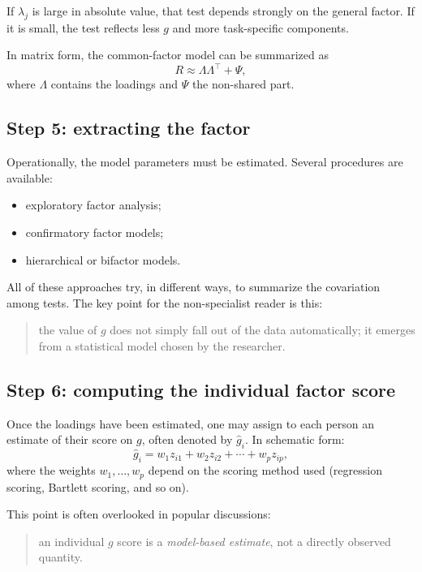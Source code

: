 \documentclass[10pt, a4paper]{article}
\theoremstyle{plain}
\theoremstyle{definition}
\theoremstyle{remark}
\begin{document}
If $\lambda_j$ is large in absolute value, that test depends strongly on the
general factor. If it is small, the test reflects less $g$ and more task-specific
components.

In matrix form, the common-factor model can be summarized as
\begin{equation}
R \approx \Lambda\Lambda^\top + \Psi,
\label{eq:commonfactor}
\end{equation}
where $\Lambda$ contains the loadings and $\Psi$ the non-shared part.

\subsection{Step 5: extracting the factor}

Operationally, the model parameters must be estimated. Several procedures are
available:
\begin{itemize}
    \item exploratory factor analysis;
    \item confirmatory factor models;
    \item hierarchical or bifactor models.
\end{itemize}

All of these approaches try, in different ways, to summarize the covariation
among tests. The key point for the non-specialist reader is this:

\begin{quote}
the value of $g$ does not simply fall out of the data automatically; it emerges
from a statistical model chosen by the researcher.
\end{quote}

\subsection{Step 6: computing the individual factor score}

Once the loadings have been estimated, one may assign to each person an estimate
of their score on $g$, often denoted by $\hat{g}_i$. In schematic form:
\begin{equation}
\hat{g}_i = w_1 z_{i1} + w_2 z_{i2} + \cdots + w_p z_{ip},
\label{eq:factorscore}
\end{equation}
where the weights $w_1,\ldots,w_p$ depend on the scoring method used
(regression scoring, Bartlett scoring, and so on).

This point is often overlooked in popular discussions:
\begin{quote}
an individual $g$ score is a \emph{model-based estimate}, not a directly
observed quantity.
\end{quote}
\end{document}
